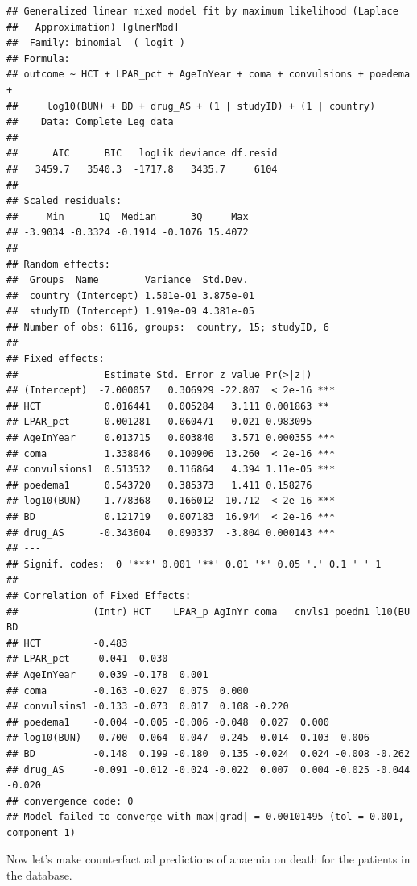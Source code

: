 \documentclass[]{article}
\begin{document}
\begin{verbatim}
## Generalized linear mixed model fit by maximum likelihood (Laplace
##   Approximation) [glmerMod]
##  Family: binomial  ( logit )
## Formula: 
## outcome ~ HCT + LPAR_pct + AgeInYear + coma + convulsions + poedema +  
##     log10(BUN) + BD + drug_AS + (1 | studyID) + (1 | country)
##    Data: Complete_Leg_data
## 
##      AIC      BIC   logLik deviance df.resid 
##   3459.7   3540.3  -1717.8   3435.7     6104 
## 
## Scaled residuals: 
##     Min      1Q  Median      3Q     Max 
## -3.9034 -0.3324 -0.1914 -0.1076 15.4072 
## 
## Random effects:
##  Groups  Name        Variance  Std.Dev. 
##  country (Intercept) 1.501e-01 3.875e-01
##  studyID (Intercept) 1.919e-09 4.381e-05
## Number of obs: 6116, groups:  country, 15; studyID, 6
## 
## Fixed effects:
##               Estimate Std. Error z value Pr(>|z|)    
## (Intercept)  -7.000057   0.306929 -22.807  < 2e-16 ***
## HCT           0.016441   0.005284   3.111 0.001863 ** 
## LPAR_pct     -0.001281   0.060471  -0.021 0.983095    
## AgeInYear     0.013715   0.003840   3.571 0.000355 ***
## coma          1.338046   0.100906  13.260  < 2e-16 ***
## convulsions1  0.513532   0.116864   4.394 1.11e-05 ***
## poedema1      0.543720   0.385373   1.411 0.158276    
## log10(BUN)    1.778368   0.166012  10.712  < 2e-16 ***
## BD            0.121719   0.007183  16.944  < 2e-16 ***
## drug_AS      -0.343604   0.090337  -3.804 0.000143 ***
## ---
## Signif. codes:  0 '***' 0.001 '**' 0.01 '*' 0.05 '.' 0.1 ' ' 1
## 
## Correlation of Fixed Effects:
##             (Intr) HCT    LPAR_p AgInYr coma   cnvls1 poedm1 l10(BU BD    
## HCT         -0.483                                                        
## LPAR_pct    -0.041  0.030                                                 
## AgeInYear    0.039 -0.178  0.001                                          
## coma        -0.163 -0.027  0.075  0.000                                   
## convulsins1 -0.133 -0.073  0.017  0.108 -0.220                            
## poedema1    -0.004 -0.005 -0.006 -0.048  0.027  0.000                     
## log10(BUN)  -0.700  0.064 -0.047 -0.245 -0.014  0.103  0.006              
## BD          -0.148  0.199 -0.180  0.135 -0.024  0.024 -0.008 -0.262       
## drug_AS     -0.091 -0.012 -0.024 -0.022  0.007  0.004 -0.025 -0.044 -0.020
## convergence code: 0
## Model failed to converge with max|grad| = 0.00101495 (tol = 0.001, component 1)
\end{verbatim}

Now let's make counterfactual predictions of anaemia on death for the
patients in the database.
\end{document}
